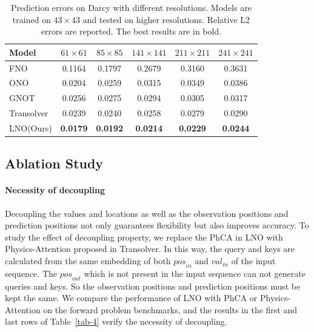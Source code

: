 \documentclass{article}
\begin{document}
\begin{table}[htbp]
\centering
\caption{Prediction errors on Darcy with different resolutions. Models are trained on $43\times43$ and tested on higher resolutions. Relative L2 errors are reported. The best results are in bold.}
\label{tab-2e}
\begin{tabular}{lccccc}
\toprule
Model&$61\times61$&$85\times85$&$141\times141$&$211\times211$&$241\times241$\\
\midrule
FNO&0.1164&0.1797&0.2679&0.3160 &0.3631\\
ONO&0.0204&0.0259&0.0315&0.0349&0.0386\\
GNOT&0.0256&0.0275&0.0294&0.0305&0.0317\\
Transolver&0.0239 &0.0240 &0.0258&0.0279&0.0290\\
LNO(Ours)&\textbf{0.0179}&\textbf{0.0192}&\textbf{0.0214}&\textbf{0.0229}&\textbf{0.0244}\\
\bottomrule
\end{tabular}
\end{table}

\subsection{Ablation Study}
\label{Ablation}
\paragraph{Necessity of decoupling}
Decoupling the values and locations as well as the observation positions and prediction positions not only guarantees flexibility but also improves accuracy. To study the effect of decoupling property, we replace the PhCA in LNO with Physics-Attention proposed in Transolver\cite{Transolver}. In this way, the query and keys are calculated from the same embedding of both ${pos}_{in}$ and ${val}_{in}$ of the input sequence. The ${pos}_{out}$ which is not present in the input sequence can not generate queries and keys. So the observation positions and prediction positions must be kept the same. We compare the performance of LNO with PhCA or Physics-Attention on the forward problem benchmarks, and the results in the first and last rows of  Table~\ref{tab-4} verify the necessity of decoupling.
\end{document}
